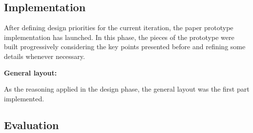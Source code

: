 


\subsection{Implementation}
\label{subsec:paper_prototype_implementation}

After defining design priorities for the current iteration, the paper prototype implementation has launched. In this phase, the pieces of the prototype were built progressively considering the key points presented before and refining some details whenever necessary.

\medskip

\textbf{General layout:}

\medskip

As the reasoning applied in the design phase, the general layout was the first part implemented. 




\subsection{Evaluation}
\label{subsec:paper_prototype_evaluation}


